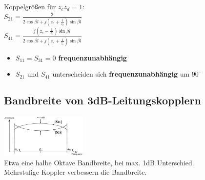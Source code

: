 \documentclass[english]{latex4ei/latex4ei_sheet}
\begin{document}
\begin{sectionbox}
	\begin{emphbox}
		Koppelgrößen für $z_e z_d = 1$:\\
		\vspace{1em}
		$S_{21}=\frac{2}{2 \cos \beta l+j\left(z_{e}+\frac{1}{z_{e}}\right) \sin \beta l}$\\
		$S_{41}=\frac{j\left(z_{e}-\frac{1}{z_{e}}\right) \sin \beta l}{2 \cos \beta l+j\left(z_{e}+\frac{1}{z_{e}}\right) \sin \beta l}$
		\begin{itemize}
			\item $S_{11} = S_{31} = 0$ \textbf{frequenzunabhängig}
			\item $S_{21}$ und $S_{41}$ unterscheiden sich \textbf{frequenzunabhängig} um $90^\circ$
		\end{itemize}
	\end{emphbox}
\end{sectionbox}
\begin{sectionbox}
	\subsection{Bandbreite von 3dB-Leitungskopplern}
	\includegraphics[width = 4.3cm]{./img/leitungskoppler_bb.png}\\
	Etwa eine halbe Oktave Bandbreite, bei max. 1dB Unterschied.\\
	Mehrstufige Koppler verbessern die Bandbreite.
\end{sectionbox}
\end{document}
